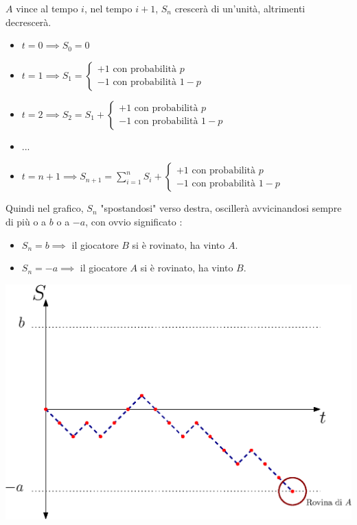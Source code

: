 \documentclass[12pt, letterpaper]{article}
\begin{document}
\(A\) vince al tempo \(i\), nel tempo \(i+1\), \(S_n\) crescerà di un'unità, altrimenti decrescerà. \begin{itemize}
    \item \(t=0\implies S_0 = 0\)
    \item \(t=1 \implies S_1=\begin{cases}
        +1 \text{ con probabilità }p\\-1  \text{ con probabilità }1-p
    \end{cases}\)
    \item \(t=2 \implies S_2=S_1 +\begin{cases}
        +1 \text{ con probabilità }p\\-1  \text{ con probabilità }1-p
    \end{cases}\)
    \item \(...\)
    \item \(t=n+1\implies S_{n+1} = \displaystyle \sum_{i=1}^{n}S_i +\begin{cases}
        +1 \text{ con probabilità }p\\-1  \text{ con probabilità }1-p
    \end{cases}\)
\end{itemize}
Quindi nel grafico, \(S_n\) "spostandosi" verso destra, oscillerà avvicinandosi sempre di più o a
 \(b\) o a \(-a\), con ovvio significato :\begin{itemize}
    \item \(S_n=b\implies\) il giocatore \(B\) si è rovinato, ha vinto \(A\).
    \item \(S_n=-a\implies\) il giocatore \(A\) si è rovinato, ha vinto \(B\).
 \end{itemize}
 \begin{center}\includegraphics[scale=0.75]{images/PasseggiataRovinata.eps}\end{center}
\end{document}

